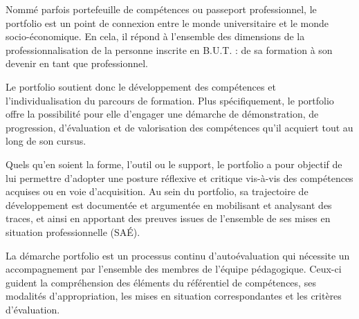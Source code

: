 \documentclass[10pt]{article}
\begin{document}
Nommé parfois portefeuille de compétences ou passeport professionnel, le
portfolio est un point de connexion entre le monde universitaire et le
monde socio-économique. En cela, il répond à l’ensemble des dimensions
de la professionnalisation de la personne inscrite en B.U.T. : de sa
formation à son devenir en tant que professionnel.

Le portfolio soutient donc le développement des compétences et
l’individualisation du parcours de formation.  Plus spécifiquement, le
portfolio offre la possibilité pour elle d’engager une démarche de
démonstration, de progression, d’évaluation et de valorisation des
compétences qu’il acquiert tout au long de son cursus.

Quels qu’en soient la forme, l’outil ou le support, le portfolio a pour
objectif de lui permettre d’adopter une posture réflexive et critique
vis-à-vis des compétences acquises ou en voie d’acquisition. Au sein du
portfolio, sa trajectoire de développement est documentée et argumentée
en mobilisant et analysant des traces, et ainsi en apportant des preuves
issues de l’ensemble de ses mises en situation professionnelle (SAÉ).

La démarche portfolio est un processus continu d’autoévaluation qui
nécessite un accompagnement par l’ensemble des membres de l’équipe
pédagogique. Ceux-ci guident la compréhension des éléments du
référentiel de compétences, ses modalités d’appropriation, les mises en
situation correspondantes et les critères d’évaluation.
\end{document}
